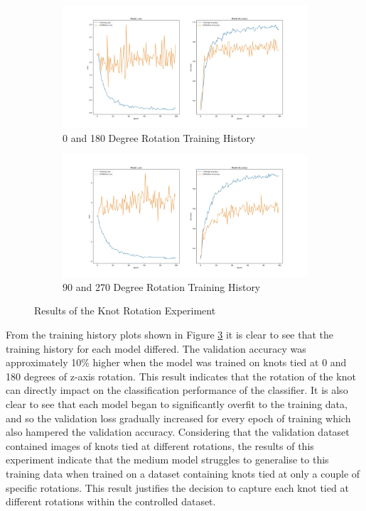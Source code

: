 \documentclass{l4proj}
\begin{document}
\begin{figure}[h]
	\begin{subfigure}{\textwidth}
		\centering
        \includegraphics[width=\linewidth]{eval/faceRotationResult}
        \caption{0 and 180 Degree Rotation Training History}
        \label{fig:FaceRotationExperiment}
	\end{subfigure}
	\begin{subfigure}{\textwidth}
		\centering
        \includegraphics[width=\linewidth]{eval/sideRotationResult}
        \caption{90 and 270 Degree Rotation Training History}
        \label{fig:SideRotationExperiment}
	\end{subfigure}
	\caption{Results of the Knot Rotation Experiment}
    \label{fig:KnotRotationResults}
\end{figure}

From the training history plots shown in Figure \ref{fig:KnotRotationResults} it is clear to see that the training history for each model differed. The validation accuracy was approximately 10\% higher when the model was trained on knots tied at 0 and 180 degrees of z-axis rotation. This result indicates that the rotation of the knot can directly impact on the classification performance of the classifier. It is also clear to see that each model began to significantly overfit to the training data, and so the validation loss gradually increased for every epoch of training which also hampered the validation accuracy. Considering that the validation dataset contained images of knots tied at different rotations, the results of this experiment indicate that the medium model struggles to generalise to this training data when trained on a dataset containing knots tied at only a couple of specific rotations. This result justifies the decision to capture each knot tied at different rotations within the controlled dataset.
\end{document}
